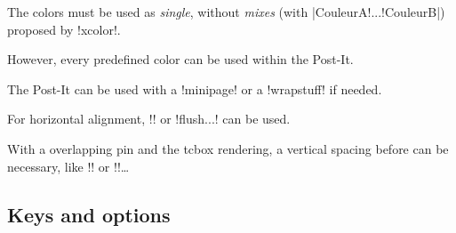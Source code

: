 \documentclass[english,a4paper,11pt]{article}
\begin{document}
\begin{DemoCode}[]
\begin{PostItNote}[Render=tikz]
\lipsum[1][1-2]
\end{PostItNote}
\begin{PostItNote}[Render=tikzv2]
\lipsum[1][1-2]
\end{PostItNote}
\end{DemoCode}

\begin{tipblock}
The colors must be used as \textit{single}, without \textit{mixes} (with \motcletex|CouleurA!...!CouleurB|) proposed by \packagetex!xcolor!. 


However, every predefined color can be used within the Post-It.
\end{tipblock}

\begin{tipblock}
The Post-It can be used with a \motcletex!minipage! or a \motcletex!wrapstuff! if needed.

For horizontal alignment, \motcletex!\hfill! or \motcletex!flush...! can be used.
\end{tipblock}

\begin{warningblock}
With a overlapping pin and the \textsf{tcbox} rendering, a vertical spacing before can be necessary, like \motcletex!\vspace! or \motcletex!\bigskip!\ldots
\end{warningblock}

\subsection{Keys and options}
\end{document}
